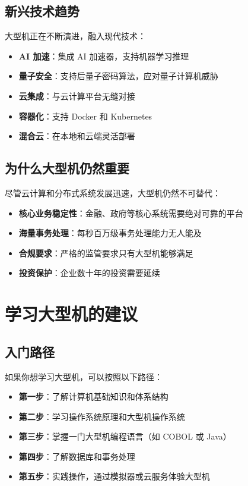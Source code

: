 \documentclass[12pt,UTF8]{ctexbook}
\begin{document}
\section{新兴技术趋势}

大型机正在不断演进，融入现代技术：

\begin{itemize}[leftmargin=2cm]
    \item \textbf{AI 加速}：集成 AI 加速器，支持机器学习推理
    \item \textbf{量子安全}：支持后量子密码算法，应对量子计算机威胁
    \item \textbf{云集成}：与云计算平台无缝对接
    \item \textbf{容器化}：支持 Docker 和 Kubernetes
    \item \textbf{混合云}：在本地和云端灵活部署
\end{itemize}

\section{为什么大型机仍然重要}

尽管云计算和分布式系统发展迅速，大型机仍然不可替代：

\begin{itemize}[leftmargin=2cm]
    \item \textbf{核心业务稳定性}：金融、政府等核心系统需要绝对可靠的平台
    \item \textbf{海量事务处理}：每秒百万级事务处理能力无人能及
    \item \textbf{合规要求}：严格的监管要求只有大型机能够满足
    \item \textbf{投资保护}：企业数十年的投资需要延续
\end{itemize}

\chapter{学习大型机的建议}
\label{chap:learning}

\section{入门路径}

如果你想学习大型机，可以按照以下路径：

\begin{itemize}[leftmargin=2cm]
    \item \textbf{第一步}：了解计算机基础知识和体系结构
    \item \textbf{第二步}：学习操作系统原理和大型机操作系统
    \item \textbf{第三步}：掌握一门大型机编程语言（如 COBOL 或 Java）
    \item \textbf{第四步}：了解数据库和事务处理
    \item \textbf{第五步}：实践操作，通过模拟器或云服务体验大型机
\end{itemize}
\end{document}
